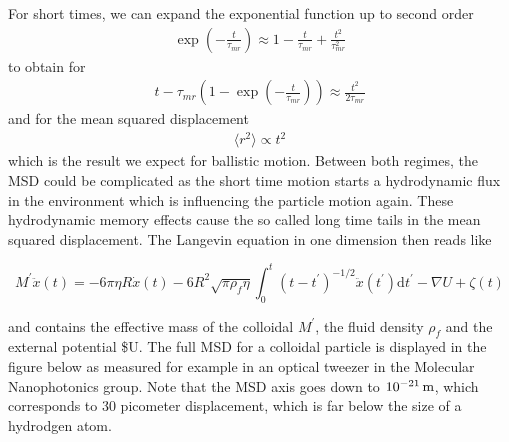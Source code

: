 \documentclass[letterpaper,10pt,english]{sphinxmanual}
\let\sphinxpxdimen\pdfpxdimen\else\newdimen\sphinxpxdimen
\begin{document}
\sphinxAtStartPar
For short times, we can expand the exponential function up to second order
\begin{equation*}
\begin{split}\exp\left ( -\frac{t}{\tau_{mr}}\right )\approx 1-\frac{t}{\tau_{mr}}+\frac{t^2}{\tau_{mr}^2}\end{split}
\end{equation*}
\sphinxAtStartPar
to obtain for
\begin{equation*}
\begin{split}t-\tau_{mr}\left ( 1-\exp\left (-\frac{t}{\tau_{mr}}\right )\right )\approx \frac{t^2}{2\tau_{mr}}\end{split}
\end{equation*}
\sphinxAtStartPar
and for the mean squared displacement
\begin{equation*}
\begin{split}\langle r^2 \rangle \propto t^2\end{split}
\end{equation*}
\sphinxAtStartPar
which is the result we expect for ballistic motion. Between both regimes, the MSD could be complicated as the short time motion starts a hydrodynamic flux in the environment which is influencing the particle motion again. These hydrodynamic memory effects cause the so called long time tails in the mean squared displacement. The Langevin equation in one dimension then reads like

\sphinxAtStartPar
\begin{equation}
M^{\prime} \ddot{x}(t)=
-6 \pi \eta R \dot{x}(t)-6 R^{2} \sqrt{\pi \rho_{f} \eta} \int_{0}^{t}\left(t-t^{\prime}\right)^{-1 / 2} \ddot{x}\left(t^{\prime}\right) \mathrm{d} t^{\prime} -\nabla U+\zeta(t)
\end{equation}

\sphinxAtStartPar
and contains the effective mass of the colloidal \(M^{\prime}\), the fluid density \(\rho_f\) and the external potential \$U. The full MSD for a colloidal particle is displayed in the figure below as measured for example in an optical tweezer in the Molecular Nanophotonics group. Note that the MSD axis goes down to \(10^{-21}\, {\rm m}\), which corresponds to 30 picometer displacement, which is far below the size of a hydrodgen atom.

\noindent\sphinxincludegraphics[width=405\sphinxpxdimen,height=410\sphinxpxdimen]{{msd_bead}.png}
\end{document}
